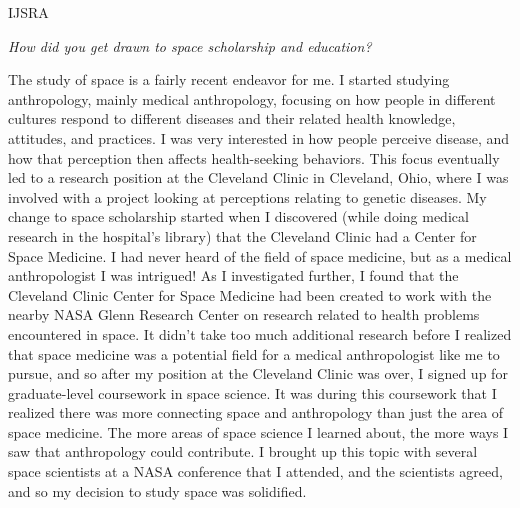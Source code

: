 \begin{labeling}{IJSRA}
	\item[IJSRA (International Journal of Student Research in Archaeology)] \emph{How did you get drawn to space scholarship and education?}

	\item[Keirsten Snover (KS)] The study of space is a fairly recent endeavor for me. I started studying anthropology, mainly medical anthropology, focusing on how people in different cultures respond to different diseases and their related health knowledge, attitudes, and practices. I was very interested in how people perceive disease, and how that perception then affects health-seeking behaviors. This focus eventually led to a research position at the Cleveland Clinic in Cleveland, Ohio, where I was involved with a project looking at perceptions relating to genetic diseases. My change to space scholarship started when I discovered (while doing medical research in the hospital’s library) that the Cleveland Clinic had a Center for Space Medicine. I had never heard of the field of space medicine, but as a medical anthropologist I was intrigued! As I investigated further, I found that the Cleveland Clinic Center for Space Medicine had been created to work with the nearby NASA Glenn Research Center on research related to health problems encountered in space. It didn’t take too much additional research before I realized that space medicine was a potential field for a medical anthropologist like me to pursue, and so after my position at the Cleveland Clinic was over, I signed up for graduate-level coursework in space science. It was during this coursework that I realized there was more connecting space and anthropology than just the area of space medicine. The more areas of space science I learned about, the more ways I saw that anthropology could contribute. I brought up this topic with several space scientists at a NASA conference that I attended, and the scientists agreed, and so my decision to study space was solidified.


\end{labeling}
